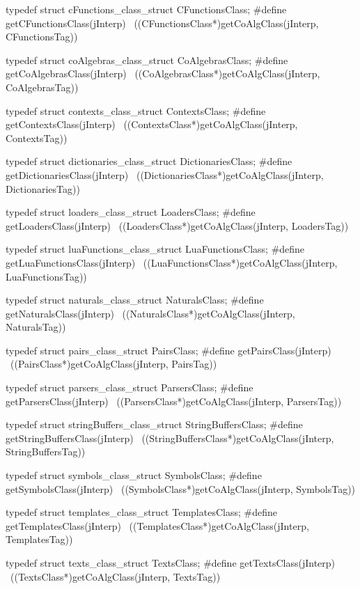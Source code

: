 typedef struct cFunctions_class_struct CFunctionsClass;
#define getCFunctionsClass(jInterp)                         \
  ((CFunctionsClass*)getCoAlgClass(jInterp, CFunctionsTag))

typedef struct coAlgebras_class_struct CoAlgebrasClass;
#define getCoAlgebrasClass(jInterp)                         \
  ((CoAlgebrasClass*)getCoAlgClass(jInterp, CoAlgebrasTag))

typedef struct contexts_class_struct ContextsClass;
#define getContextsClass(jInterp)                           \
  ((ContextsClass*)getCoAlgClass(jInterp, ContextsTag))

typedef struct dictionaries_class_struct DictionariesClass;
#define getDictionariesClass(jInterp)                \
  ((DictionariesClass*)getCoAlgClass(jInterp, DictionariesTag))

typedef struct loaders_class_struct LoadersClass;
#define getLoadersClass(jInterp)                          \
  ((LoadersClass*)getCoAlgClass(jInterp, LoadersTag))

typedef struct luaFunctions_class_struct LuaFunctionsClass;
#define getLuaFunctionsClass(jInterp)                          \
  ((LuaFunctionsClass*)getCoAlgClass(jInterp, LuaFunctionsTag))

typedef struct naturals_class_struct NaturalsClass;
#define getNaturalsClass(jInterp)                           \
  ((NaturalsClass*)getCoAlgClass(jInterp, NaturalsTag))

typedef struct pairs_class_struct PairsClass;
#define getPairsClass(jInterp)                              \
  ((PairsClass*)getCoAlgClass(jInterp, PairsTag))

typedef struct parsers_class_struct ParsersClass;
#define getParsersClass(jInterp)                            \
  ((ParsersClass*)getCoAlgClass(jInterp, ParsersTag))

typedef struct stringBuffers_class_struct StringBuffersClass;
#define getStringBuffersClass(jInterp)                      \
  ((StringBuffersClass*)getCoAlgClass(jInterp, StringBuffersTag))

typedef struct symbols_class_struct SymbolsClass;
#define getSymbolsClass(jInterp)                            \
  ((SymbolsClass*)getCoAlgClass(jInterp, SymbolsTag))
  
typedef struct templates_class_struct TemplatesClass;
#define getTemplatesClass(jInterp)                          \
  ((TemplatesClass*)getCoAlgClass(jInterp, TemplatesTag))

typedef struct texts_class_struct TextsClass;
#define getTextsClass(jInterp)                              \
  ((TextsClass*)getCoAlgClass(jInterp, TextsTag))
\stopCHeader

